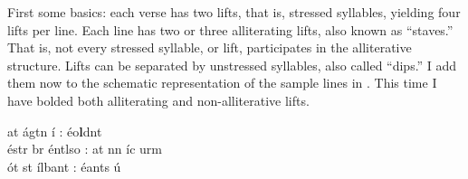 \begin{table}
\caption{Categories of alliterating lines (\textit{Hildebrandslied}, lines 42–44). \textbf{a} = alliterating lift, i.e., stave;
x = non-alliterating lift;
: = pause between verses.}
\label{tab:6:6.2}
\end{table}

\noindent First some basics: each verse has two lifts, that is, stressed syllables, yielding four lifts per line. Each line has two or three alliterating lifts, also known as “staves.” That is, not every stressed syllable, or lift, participates in the alliterative structure. Lifts can be separated by unstressed syllables, also called “dips.” I add them now to the schematic representation of the sample lines in . This time I have bolded both alliterating and non-alliterative lifts.

\ea%
    \label{ex:6:15}
at  ágtn  í  :  éo\textbf{l}dnt\medskip\\
éstr  br  éntlso  :  at  nn    íc  urm\medskip\\
ót  st  ílbant  :  éants  ú
    \z

